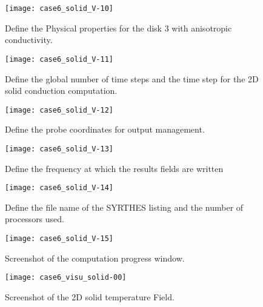 \begin{figure}[h!]
\begin{center}
\texttt{[image: case6\_solid\_V-10]}
\caption{Define the Physical properties for the disk 3 with anisotropic conductivity.}
\label{fig1_e5}
\end{center}
\end{figure}

\begin{figure}[h!]
\begin{center}
\texttt{[image: case6\_solid\_V-11]}
\caption{Define the global number of time steps and the time step for the 2D solid conduction computation.}
\label{fig1_e5}
\end{center}
\end{figure}
\newpage

\begin{figure}[h!]
\begin{center}
\texttt{[image: case6\_solid\_V-12]}
\caption{Define the probe coordinates for output management.}
\label{fig1_e5}
\end{center}
\end{figure}

\begin{figure}[h!]
\begin{center}
\texttt{[image: case6\_solid\_V-13]}
\caption{Define the frequency at which the results fields are written}
\label{fig1_e5}
\end{center}
\end{figure}
\newpage

\begin{figure}[h!]
\begin{center}
\texttt{[image: case6\_solid\_V-14]}
\caption{Define the file name of the SYRTHES listing and the number of processors used.}
\label{fig1_e5}
\end{center}
\end{figure}

\begin{figure}[h!]
\begin{center}
\texttt{[image: case6\_solid\_V-15]}
\caption{Screenshot of the computation progress window.}
\label{fig1_e5}
\end{center}
\end{figure}
\newpage

\begin{figure}[h!]
\begin{center}
\texttt{[image: case6\_visu\_solid-00]}
\caption{Screenshot of the 2D solid temperature Field.}
\label{fig1_e5}
\end{center}
\end{figure}

